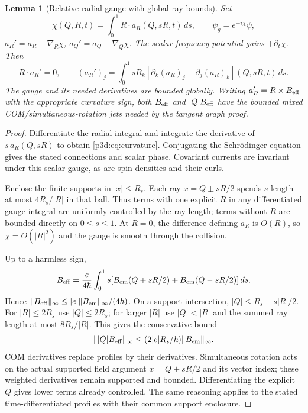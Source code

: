 \documentclass[11pt]{article}
\numberwithin{equation}{section}
\newtheorem{lemma}[theorem]{Lemma}
\theoremstyle{definition}
\theoremstyle{remark}
\begin{document}
\begin{lemma}[Relative radial gauge with global ray bounds]
\label{p3d:lem:gauge}
Set
\[
 \chi(Q,R,t)=\int_0^1R\cdot a_R(Q,sR,t)\,ds,\qquad
 \psi_g=e^{-i\chi}\psi,
\]
$a_R'=a_R-\nabla_R\chi$, $a_Q'=a_Q-\nabla_Q\chi$.
The scalar frequency potential gains $+\partial_t\chi$. Then
\begin{equation}\label{p3d:eq:curvature}
 R\cdot a_R'=0,\qquad
 (a_R')_j=\int_0^1sR_k
        [\partial_k(a_R)_j-\partial_j(a_R)_k](Q,sR,t)\,ds.
\end{equation}
The gauge and its needed derivatives are bounded globally.
Writing $a_R'=R\times B_{\rm eff}$ with the appropriate curvature sign,
both $B_{\rm eff}$ and $|Q|B_{\rm eff}$ have the bounded mixed
COM/simultaneous-rotation jets needed by the tangent graph proof.
\end{lemma}
\begin{proof}
Differentiate the radial integral and integrate the derivative of
$s\,a_R(Q,sR)$ to obtain \eqref{p3d:eq:curvature}. Conjugating the
Schr\"odinger equation gives the stated connections and scalar phase.
Covariant currents are invariant under this scalar gauge, as are spin
densities and their curls.

Enclose the finite supports in $|x|\leq R_s$. Each ray
$x=Q\pm sR/2$ spends $s$-length at most $4R_s/|R|$ in that ball.
Thus terms with one explicit $R$ in any differentiated gauge integral
are uniformly controlled by the ray length; terms without $R$ are
bounded directly on $0\leq s\leq1$.
At $R=0$, the difference defining $a_R$ is $O(R)$, so $\chi=O(|R|^2)$
and the gauge is smooth through the collision.

Up to a harmless sign,
\[
 B_{\rm eff}=\frac e{4\hbar}\int_0^1s
 [B_{\rm em}(Q+sR/2)+B_{\rm em}(Q-sR/2)]\,ds .
\]
Hence
$\|B_{\rm eff}\|_\infty\leq|e|\|B_{\rm em}\|_\infty/(4\hbar)$.
On a support intersection,
$|Q|\leq R_s+s|R|/2$.
For $|R|\leq2R_s$ use $|Q|\leq2R_s$; for larger $|R|$ use
$|Q|<|R|$ and the summed ray length at most $8R_s/|R|$.
This gives the conservative bound
\[
 \||Q|B_{\rm eff}\|_\infty
 \leq(2|e|R_s/\hbar)\|B_{\rm em}\|_\infty.
 \]
COM derivatives replace profiles by their derivatives.
Simultaneous rotation acts on the actual supported field argument
$x=Q\pm sR/2$ and its vector index; these weighted derivatives remain
supported and bounded. Differentiating the explicit $Q$ gives lower
terms already controlled. The same reasoning applies to the stated
time-differentiated profiles with their common support enclosure.
\end{proof}
\end{document}
